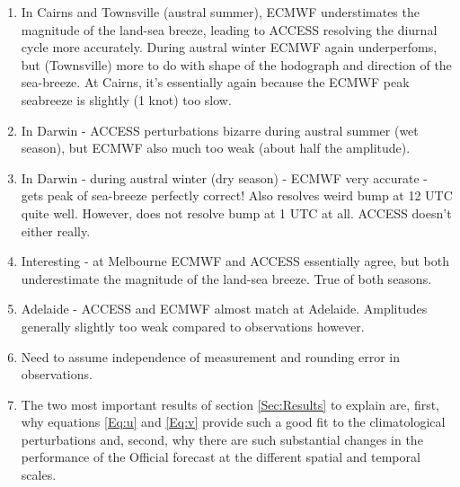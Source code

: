 \documentclass{article}
\begin{document}
\begin{enumerate}
\item
In Cairns and Townsville (austral summer), ECMWF understimates the magnitude of the land-sea breeze, leading to ACCESS resolving the diurnal cycle more accurately. During austral winter ECMWF again underperfoms, but (Townsville) more to do with shape of the hodograph and direction of the sea-breeze. At Cairns, it's essentially again because the ECMWF peak seabreeze is slightly (1 knot) too slow.   
\item
In Darwin - ACCESS perturbations bizarre during austral summer (wet season), but ECMWF also much too weak (about half the amplitude). 
\item
In Darwin - during austral winter (dry season) - ECMWF very accurate - gets peak of sea-breeze perfectly correct! Also resolves weird bump at 12 UTC quite well. However, does not resolve bump at 1 UTC at all. ACCESS doesn't either really. 
\item
Interesting - at Melbourne ECMWF and ACCESS essentially agree, but both underestimate the magnitude of the land-sea breeze. True of both seasons. 
\item
Adelaide - ACCESS and ECMWF almost match at Adelaide. Amplitudes generally slightly too weak compared to observations however. 
\item
Need to assume independence of measurement and rounding error in observations. 
\item
The two most important results of section \ref{Sec:Results} to explain are, first, why equations \ref{Eq:u} and \ref{Eq:v} provide such a good fit to the climatological perturbations and, second, why there are such substantial changes in the performance of the Official forecast at the different spatial and temporal scales. 


\end{enumerate}
\end{document}
